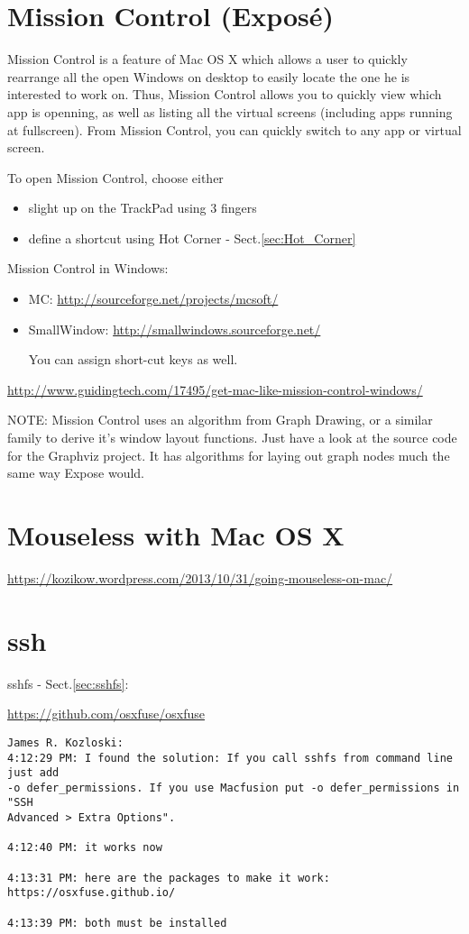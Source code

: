\section{Mission Control (Expos\'{e})}
\label{sec:Mission_Control}

Mission Control is a feature of Mac OS X which allows a user to quickly
rearrange all the open Windows on desktop to easily locate the one he is
interested to work on. Thus, Mission Control allows you to quickly view which
app is openning, as well as listing all the virtual screens (including apps
running at fullscreen). From Mission Control, you can quickly switch to any app
or virtual screen.

To open Mission Control, choose either
\begin{itemize}
  \item slight up on the TrackPad using 3 fingers
  \item define a shortcut using Hot Corner - Sect.\ref{sec:Hot_Corner}
\end{itemize}


Mission Control in Windows:
\begin{itemize}
  \item MC: \url{http://sourceforge.net/projects/mcsoft/}
  
  \item SmallWindow: \url{http://smallwindows.sourceforge.net/}
  
You can assign short-cut keys as well.  
\end{itemize}
\url{http://www.guidingtech.com/17495/get-mac-like-mission-control-windows/}

NOTE: Mission Control uses an algorithm from
Graph Drawing, or a similar family to derive it's window layout functions.
Just have a look at the source code for the Graphviz project. It has algorithms
for laying out graph nodes much the same way Expose would.

\section{Mouseless with Mac OS X}

\url{https://kozikow.wordpress.com/2013/10/31/going-mouseless-on-mac/}

\section{ssh}
\label{sec:sshfs-MacOS}

sshfs - Sect.\ref{sec:sshfs}:

\url{https://github.com/osxfuse/osxfuse}

\begin{verbatim}
James R. Kozloski: 
4:12:29 PM: I found the solution: If you call sshfs from command line just add
-o defer_permissions. If you use Macfusion put -o defer_permissions in "SSH
Advanced > Extra Options".  

4:12:40 PM: it works now 

4:13:31 PM: here are the packages to make it work: https://osxfuse.github.io/ 

4:13:39 PM: both must be installed 
\end{verbatim}

